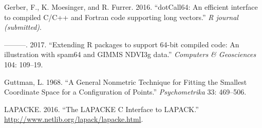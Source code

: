 \documentclass[12pt,]{article}
\begin{document}
\hypertarget{ref-gerber_moesinger_furrer_16}{}
Gerber, F., K. Moesinger, and R. Furrer. 2016. ``dotCall64: An efficient
interface to compiled C/C++ and Fortran code supporting long vectors.''
\emph{R journal (submitted)}.

\hypertarget{ref-gerber_moesinger_furrer_17}{}
---------. 2017. ``Extending R packages to support 64-bit compiled code:
An illustration with spam64 and GIMMS NDVI3g data.'' \emph{Computers \&
Geosciences} 104: 109--19.

\hypertarget{ref-guttman_68}{}
Guttman, L. 1968. ``A General Nonmetric Technique for Fitting the
Smallest Coordinate Space for a Configuration of Points.''
\emph{Psychometrika} 33: 469--506.

\hypertarget{ref-lapacke_16}{}
LAPACKE. 2016. ``The LAPACKE C Interface to LAPACK.''
\url{http://www.netlib.org/lapack/lapacke.html}.
\end{document}

